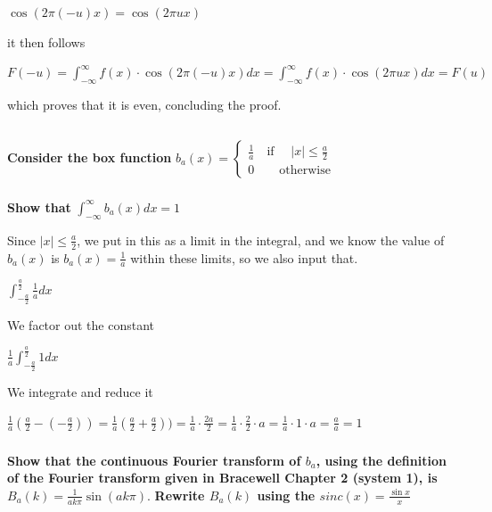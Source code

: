 \documentclass[12pt]{article} %
\begin{document}
$\cos(2 \pi (-u) x)  =\cos(2 \pi u x) $

it then follows

$F(-u) =\int_{- \infty}^{\infty} f(x)
\cdot \cos(2 \pi (-u) x) dx
=
\int_{- \infty}^{\infty} f(x)
\cdot \cos(2 \pi u x)dx
=
F(u)$

which proves that it is even, concluding the proof.

\pagebreak

\subsection{}
\textbf{Consider the box function}
$
b_a (x) = \begin{cases}
    \frac{1}{a} \quad \text{if } \quad |x| \leq \frac{a}{2}\\
    0 \qquad \text{otherwise}
\end{cases}
$

\subsubsection{}
\textbf{Show that} $\int_{-\infty}^{\infty} b_a (x)dx = 1$

Since $ |x| \leq \frac{a}{2}$, we put in this as a limit in the integral, and we know the value of $b_a (x)$ is $b_a (x) = \frac{1}{a}$ within these limits, so we also input that.

$ \int_{-\frac{a}{2}}^{\frac{a}{2}} \frac{1}{a} dx $

We factor out the constant

$  \frac{1}{a}\int_{-\frac{a}{2}}^{\frac{a}{2}}1  dx $

We integrate and reduce it

$\frac{1}{a} (\frac{a}{2} - (- \frac{a}{2})) =
\frac{1}{a} (\frac{a}{2} + \frac{a}{2}))=
\frac{1}{a}\cdot\frac{2a}{2} =
\frac{1}{a}\cdot\frac{2}{2} \cdot a =
\frac{1}{a} \cdot1\cdot a  =
\frac{a}{a} =
1$







\pagebreak
\subsubsection{}
\textbf{Show that the continuous Fourier transform of $b_a$, using the definition of the Fourier transform given in Bracewell Chapter 2 (system 1),
is  $B_a(k)= \frac{1}{ak\pi} \sin(ak\pi)$}. \textbf{Rewrite $B_a(k)$ using the $sinc(x)= \frac{\sin x}{x} $}\\
\end{document}
